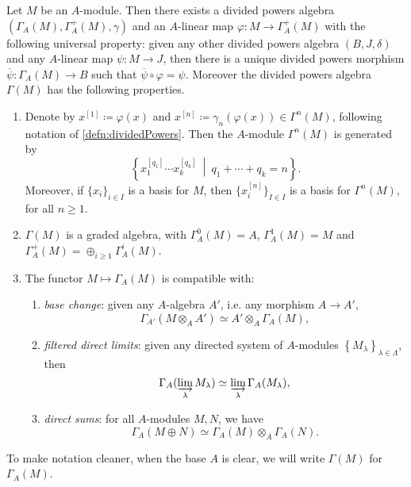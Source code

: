 \begin{thm}\label{thm:PDSymAlg}
	Let $M$ be an $A$-module.
	Then there exists a divided powers algebra 
	$\left(\Gamma_A(M), \Gamma_A^+(M), \gamma\right)$ and an $A$-linear
	map $\varphi\colon M \to \Gamma_A^+(M)$ with the following
	universal property:
	given any other divided powers algebra
	$\left(B, J, \delta\right)$ and any $A$-linear
	map $\psi\colon M \to J$,
	then there is a unique divided powers morphism
	$\overline{\psi}\colon \Gamma_A(M) \to B$
	such that $\overline{\psi} \circ \varphi = \psi$.
	Moreover the divided powers algebra $\Gamma(M)$ 
	has the following properties.
\begin{enumerate}
	\item Denote by $x^{[1]} \coloneqq \varphi(x)$ and $x^{[n]} \coloneqq \gamma_n(\varphi(x)) \in
		\Gamma^n(M)$, following notation of \cref{defn:dividedPowers}.
		Then the $A$-module $\Gamma^n(M)$ is generated by
		\begin{equation*}
		\left\{ x_1^{[q_1]} \cdots x_k^{[q_k]} \ \middle|\ 
		q_1 + \cdots + q_k = n \right\}
		.\end{equation*}
		Moreover, if $\{ x_i \}_{i \in I}$ is a basis
		for $M$, then $\{ x^{[n]}_i \}_{I \in I}$
		is a basis for $\Gamma^n(M)$,
		for all $n \geq 1$.

	\item $\Gamma(M)$ is a graded algebra, with
		$\Gamma_A^0(M) = A$, $\Gamma_A^1(M) = M$
		and $\Gamma_A^+(M) = \oplus_{i \geq 1} \Gamma_A^i(M)$.

	\item The functor $M \mapsto \Gamma_A(M)$ is compatible with:
		\begin{enumerate}
			\item {\em base change}: given any $A$-algebra $A'$,
				i.e. any morphism $A \to A'$,
				\begin{equation*}
					\Gamma_{A'}(M \otimes_A A') \simeq A' \otimes_A \Gamma_A(M)
				,\end{equation*}

			\item {\em filtered direct limits}: given any directed system
				of $A$-modules $\left\{ M_\lambda \right\}_{\lambda \in \Lambda}$, then
				\begin{equation*}
					\Gamma_A(\varinjlim_\lambda M_\lambda) \simeq
					\varinjlim_\lambda \Gamma_A(M_\lambda)
				,\end{equation*}
				
			\item {\em direct sums}: for all $A$-modules $M,N$, we have
				\begin{equation*}
					\Gamma_A(M \oplus N) \simeq
					\Gamma_A(M) \otimes_A \Gamma_A(N)
				.\end{equation*}
		\end{enumerate}
\end{enumerate}
	To make notation cleaner, when the base $A$ is clear, we
	will write $\Gamma(M)$ for $\Gamma_A(M)$.
\end{thm}


